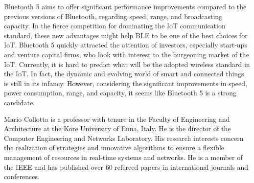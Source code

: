 \documentclass[12pt, draftclsnofoot, onecolumn]{IEEEtran}
\begin{document}
Bluetooth 5 aims to offer significant performance improvements compared to the previous versions of Bluetooth, regarding speed, range, and broadcasting capacity. In the fierce competition for dominating the IoT communication standard, these new advantages might help BLE to be one of the best choices for IoT. Bluetooth 5 quickly attracted the attention of investors, especially start-ups and venture capital firms, who look with interest to the burgeoning market of the IoT. Currently, it is hard to predict what will be the adopted wireless standard in the IoT. In fact, the dynamic and evolving world of smart and connected things is still in its infancy. However, considering the significant improvements in speed, power consumption, range, and capacity, it seems like Bluetooth 5 is a strong candidate.




% 




\begin{IEEEbiographynophoto}{Mario Collotta}
is a professor with tenure in the Faculty of Engineering and Architecture at the Kore University of Enna, Italy. He is the director of the Computer Engineering and Networks Laboratory. His research interests concern the realization of strategies and innovative algorithms to ensure a flexible management of resources in real-time systems and networks. He is a member of the IEEE and has published over 60 refereed papers in international journals and conferences.
\end{IEEEbiographynophoto}
\end{document}
